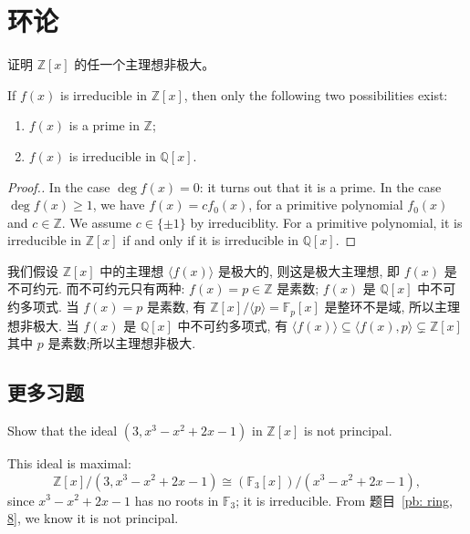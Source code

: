\section{环论}
\setcounter{pb}{8}
\begin{problem}
    \label{pb: ring, 8}
    证明 $ \mathbb{Z}[x] $ 的任一个主理想非极大。
\end{problem}

\begin{lemma}
    If $f(x)$ is irreducible in $\mathbb{Z}[x]$, then only the following two possibilities exist: 
    \begin{enumerate}
        \item $f(x)$ is a prime in $\mathbb{Z}$;
        \item $f(x)$ is irreducible in $\mathbb{Q}[x]$.
    \end{enumerate}
\end{lemma}
\begin{proof}[Proof.]
    In the case $\deg f(x)=0$: it turns out that it is a prime. In the case $\deg f(x)\geq1$, we have $f(x)=c f_0(x)$, 
    for a primitive polynomial $f_0(x)$ and $c\in\mathbb{Z}$. We assume $c\in\{\pm1\}$ by irreduciblity. 
    For a primitive polynomial, it is irreducible in $\mathbb{Z}[x]$ if and only if it is irreducible in $\mathbb{Q}[x]$.
\end{proof}

\begin{solution}
    我们假设 $\mathbb{Z}[x]$ 中的主理想 $\langle f(x) \rangle $ 是极大的, 则这是极大主理想, 即 $f(x)$ 是不可约元. 
    而不可约元只有两种: $f(x)=p\in\mathbb{Z}$ 是素数; $f(x)$ 是 $\mathbb{Q}[x]$ 中不可约多项式. 
    当 $f(x)=p$ 是素数, 有 $\mathbb{Z}[x]/\langle p \rangle=\mathbb{F}_{p}[x]$ 是整环不是域, 所以主理想非极大. 
    当 $f(x)$ 是 $\mathbb{Q}[x]$ 中不可约多项式, 有 $\langle f(x) \rangle \subseteq \langle f(x),p \rangle \subsetneq \mathbb{Z}[x]$ 其中 $p$ 是素数;所以主理想非极大.
\end{solution}

\subsection{更多习题}
\setcounter{pb}{13}

\begin{problem}
    Show that the ideal $(3, x^3-x^2 + 2x- 1)$ in $\mathbb{Z}[x]$ is not principal.
\end{problem}

\begin{solution}
    This ideal is maximal:
        \[
            \mathbb{Z}[x]/(3, x^3-x^2 + 2x- 1)\cong({\mathbb{F}_3[x]})/( x^3-x^2 + 2x- 1),
        \]
    since $x^3-x^2 + 2x- 1$ has no roots in $\mathbb{F}_3$; it is irreducible. 
    From 题目~\ref{pb: ring, 8}, we know it is not principal.
\end{solution}

